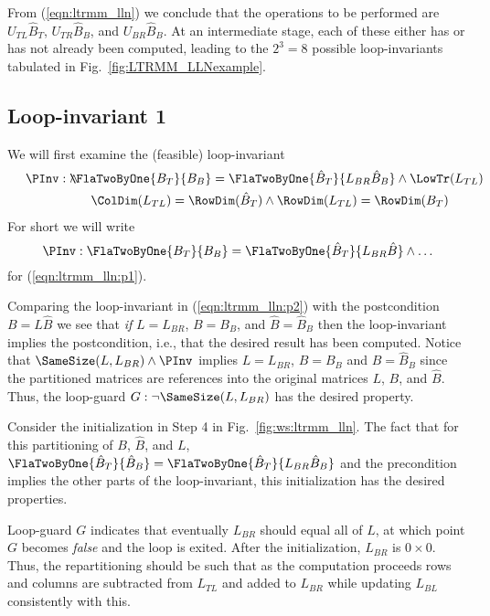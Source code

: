 

From (\ref{eqn:ltrmm_lln}) we conclude that the operations to be
performed are $ U_{TL} \hat{B}_T $, $ U_{TR} \hat{B}_B $, and $ U_{BR}
\hat{B}_B $.  At an intermediate stage, each of these either has or
has not already been computed, leading to the $ 2^3 = 8 $ possible
loop-invariants tabulated in Fig.~\ref{fig:LTRMM_LLNexample}.

\subsection{Loop-invariant 1}

We will first examine the (feasible) loop-invariant
\begin{eqnarray}
\label{eqn:ltrmm_lln:p1}
\PInv: 
\lefteqn{
\FlaTwoByOne{ B_T}{B_B} =
\FlaTwoByOne{ \hat{B}_T }
            { L_{BR} \hat{B}_B }
\wedge
\LowTr( L_{TL} ) } \wedge \\
\nonumber
& & 
\ColDim( L_{TL} ) = \RowDim( \hat{B}_T ) 
\wedge
\RowDim( L_{TL} ) = \RowDim( {B}_T ) 
\end{eqnarray}
For short we will write
\begin{equation}
\label{eqn:ltrmm_lln:p2}
\PInv: \FlaTwoByOne{ B_T}{B_B} =
\FlaTwoByOne{ \hat{B}_T }
            { L_{BR} \hat{B} }
\wedge
\ldots
\end{equation}
for (\ref{eqn:ltrmm_lln:p1}).

Comparing the loop-invariant in (\ref{eqn:ltrmm_lln:p2}) with the
postcondition $ B = L \hat{B} $ we see that {\em if} $L=L_{BR}$, $ B =
B_B $, and $ \hat{B} = \hat{B}_B $ then the loop-invariant implies the
postcondition, i.e., that the desired result has been computed.
Notice that $ \SameSize( L, L_{BR} ) \wedge \PInv $ implies $ L =
L_{BR} $, $ B = B_B $ and $ \hat{B}=\hat{B}_B $ since the partitioned
matrices are references into the original matrices $ L $, $ B $, and $
\hat{B} $.  Thus, the loop-guard $ G: \neg \SameSize( L, L_{BR} ) $
has the desired property.

Consider the initialization in Step 4 in Fig.~\ref{fig:ws:ltrmm_lln}.
The fact that for this partitioning of $ B $, $ \hat{B} $, and $ L $,
$
\FlaTwoByOne{ \hat{B}_T}
            { \hat{B}_B} =
\FlaTwoByOne{ \hat{B}_T}
            { L_{BR} \hat{B}_B } $ and the precondition implies the
other parts of the loop-invariant, this initialization has the desired
properties.

Loop-guard $ G $ indicates that eventually $ L_{BR} $ should equal all
of $ L $, at which point $ G $ becomes {\em false} and the loop is
exited.  After the initialization, $ L_{BR} $ is $ 0 \times 0 $.
Thus, the repartitioning should be such that as the computation
proceeds rows and columns are subtracted from $ L_{TL} $ and added to
$ L_{BR} $ while updating $ L_{BL} $ consistently with this.

